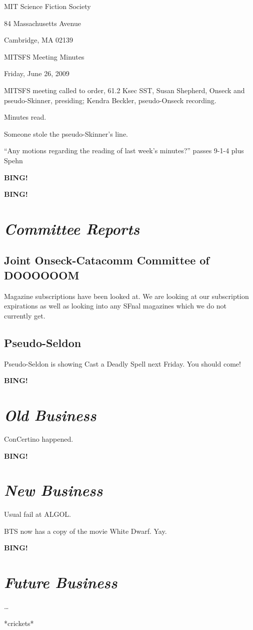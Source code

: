 \documentclass[10pt]{article}
\newcommand{\bing}{{\bf BING!} }
\newcommand{\goto}[1]{\bing \vskip 12pt \section*{{\em{#1}}}}
\newcommand{\ps}{ plus Spehn\xspace}
\begin{document}
\begin{center}

MIT Science Fiction Society

84 Massachusetts Avenue

Cambridge, MA 02139

\vspace{12pt}

MITSFS Meeting Minutes

Friday, June 26, 2009

\end{center}

\vspace{18pt}

\setlength{\parskip}{6pt}

\noindent
MITSFS meeting called to order, 61.2 Ksec SST,
Susan Shepherd, Onseck and pseudo-Skinner, presiding; Kendra Beckler, pseudo-Onseck recording.

Minutes read.

Someone stole the pseudo-Skinner's line.

``Any motions regarding the reading of last week's minutes?'' passes 9-1-4 \ps

\bing

\goto{Committee Reports}

\subsection*{Joint Onseck-Catacomm Committee of DOOOOOOM}

Magazine subscriptions have been looked at.  We are looking at our subscription expirations as well as looking into any SFnal magazines which we do not currently get.

\subsection*{Pseudo-Seldon}

Pseudo-Seldon is showing Cast a Deadly Spell next Friday.  You should come!

\goto{Old Business}

ConCertino happened.

\goto{New Business}

Usual fail at ALGOL.

BTS now has a copy of the movie White Dwarf.  Yay.

\goto{Future Business}

\ldots

*crickets*
\end{document}
